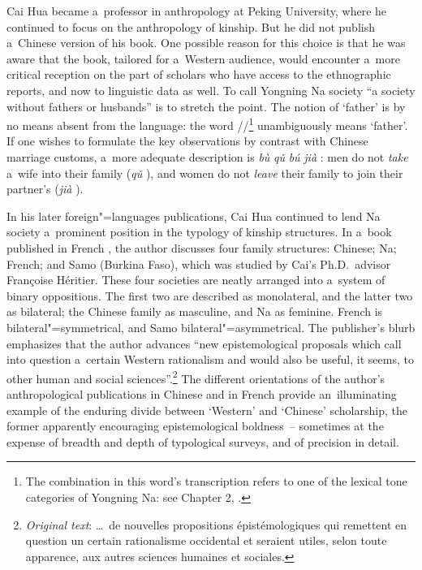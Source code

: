 Cai Hua became
a~professor in anthropology at Peking University, where he continued to focus on the anthropology of
kinship. But he did not publish a~Chinese version of his book. One possible reason for this choice is that he was
aware that the book, tailored for a~Western audience, would encounter a~more critical reception on
the part of scholars who have access to the ethnographic reports, and now to linguistic data as well. To call Yongning Na society “a society without fathers or husbands” is
to stretch the point. The notion of ‘father’ is by no means absent from the language: the
word //\footnote{The combination  in this word's transcription refers to one of the lexical tone categories of Yongning Na: see Chapter 2, .} unambiguously means ‘father’. If one wishes to formulate the key observations
by contrast with Chinese marriage customs, a~more adequate description 
is \textit{bù} \textit{qǔ} \textit{bú} \textit{jià} 
: men do not
\textit{take} a~wife into their family (\textit{qǔ} ), and women do not \textit{leave} their
family to join their partner’s (\textit{jià} ).

In his later foreign"=languages publications, Cai Hua continued to lend Na society a~prominent
position in the typology of kinship structures. In a~book published in {French} \citep{cai2008}, the author discusses four family structures: Chinese; Na; {French}; and Samo
(Burkina Faso), which was studied by Cai’s Ph.D.\ advisor Françoise Héritier. These four societies are neatly
arranged into a~system of binary oppositions. The first two are described as monolateral, and the latter two as
bilateral; the Chinese family as masculine, and Na as feminine. {French} is bilateral"=symmetrical, and
Samo bilateral"=asymmetrical. The publisher’s blurb emphasizes that the author advances “new
epistemological proposals which call into {question} a~certain Western rationalism and would also be
useful, it seems, to other human and social sciences”.\footnote{\textit{Original text}: {\dots}~de nouvelles propositions épistémologiques
	qui remettent en {question} un certain rationalisme occidental et seraient utiles, selon toute
	apparence, aux autres sciences humaines et sociales.} The different orientations of the author’s
anthropological publications in Chinese and in {French} provide an~illuminating example of the
enduring divide between ‘Western’ and ‘Chinese’ scholarship, the former apparently encouraging
epistemological boldness~-- sometimes at the expense of breadth and depth of typological surveys,
and of precision in detail.


